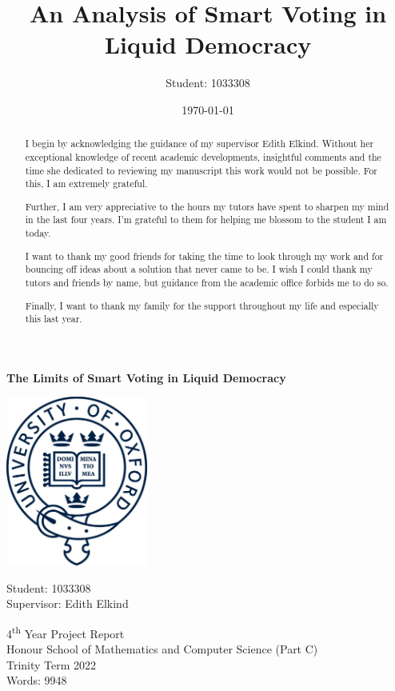 \documentclass[11pt,a4paper, titlepage]{article}
\title{An Analysis of Smart Voting in Liquid Democracy}
\author{Student: 1033308}
\date{\today}
\theoremstyle{definition}
\begin{document}
\begin{titlepage}
    \begin{center}
        \huge
        \textbf{The Limits of Smart Voting in Liquid Democracy}

        \vfill
        
        \includegraphics[width=0.35\textwidth]{logo.jpeg}
        
        \vfill
        
        \LARGE
        Student: 1033308 \\
        \Large
        Supervisor: Edith Elkind\\
        
        \vspace*{1.5cm}
        
        4\textsuperscript{th} Year Project Report\\
        \vspace*{2pt}
        Honour School of Mathematics and Computer Science (Part C)\\
        \vspace*{.5cm}
        Trinity Term 2022 \\
        Words: 9948
    \end{center}

\end{titlepage}

\renewcommand{\abstractname}{Acknowledgements}
\begin{abstract}
    I begin by acknowledging the guidance of my supervisor Edith Elkind. Without her exceptional knowledge of recent academic developments, insightful comments and the time she dedicated to reviewing my manuscript this work would not be possible.
For this, I am extremely grateful.

Further, I am very appreciative to the hours my tutors have spent to sharpen my mind in the last four years. I'm grateful to them for helping me blossom to the student I am today.

I want to thank my good friends for taking the time to look through my work and for bouncing off ideas about a solution that never came to be.
I wish I could thank my tutors and friends by name, but guidance from the academic office forbids me to do so.

Finally, I want to thank my family for the support throughout my life and especially this last year.

\end{abstract}
\end{document}
